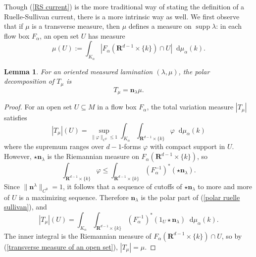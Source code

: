 \documentclass[reqno,11pt]{amsart}
\newcommand{\RR}{\mathbf{R}}
\newcommand*\dif{\mathop{}\!\mathrm{d}}
\DeclareMathOperator{\supp}{supp}
\newcommand{\normal}{\mathbf n}
\newtheorem{lemma}[theorem]{Lemma}
\theoremstyle{definition}
\numberwithin{equation}{section}
\begin{document}

Though (\ref{RS current}) is the more traditional way of stating the definition of a Ruelle-Sullivan current, there is a more intrinsic way as well.
We first observe that if $\mu$ is a transverse measure, then $\mu$ defines a measure on $\supp \lambda$: in each flow box $F_\alpha$, an open set $U$ has measure
\begin{equation}\label{transverse measure of an open set}
\mu(U) := \int_{K_\alpha} |F_\alpha(\RR^{d - 1} \times \{k\}) \cap U| \dif \mu_\alpha(k).
\end{equation}

\begin{lemma}
For an oriented measured lamination $(\lambda, \mu)$, the polar decomposition of $T_\mu$ is
\begin{equation}\label{polar ruelle sullivan}
T_\mu = \normal_\lambda \mu.
\end{equation}
\end{lemma}
\begin{proof}
For an open set $U \subseteq M$ in a flow box $F_\alpha$, the total variation measure $|T_\mu|$ satisfies
$$|T_\mu|(U) = \sup_{\|\varphi\|_{C^0} \leq 1} \int_{K_\alpha} \int_{\RR^{d - 1} \times \{k\}} \varphi \dif \mu_\alpha(k)$$
where the supremum ranges over $d-1$-forms $\varphi$ with compact support in $U$.
However, $\star \normal_\lambda$ is the Riemannian measure on $F_\alpha(\RR^{d - 1} \times \{k\})$, so
$$\int_{\RR^{d - 1} \times \{k\}} \varphi \leq \int_{\RR^{d - 1} \times \{k\}} (F_\alpha^{-1})^*(\star \normal_\lambda).$$
Since $\|\normal^\lambda\|_{C^0} = 1$, it follows that a sequence of cutoffs of $\star \normal_\lambda$ to more and more of $U$ is a maximizing sequence.
Therefore $\normal_\lambda$ is the polar part of (\ref{polar ruelle sullivan}), and
$$|T_\mu|(U) = \int_{K_\alpha} \int_{\RR^{d - 1} \times \{k\}} (F_\alpha^{-1})^*(1_U \star \normal_\lambda) \dif \mu_\alpha(k).$$
The inner integral is the Riemannian measure of $F_\alpha(\RR^{d - 1} \times \{k\}) \cap U$, so by (\ref{transverse measure of an open set}), $|T_\mu| = \mu$.
\end{proof}
\end{document}
